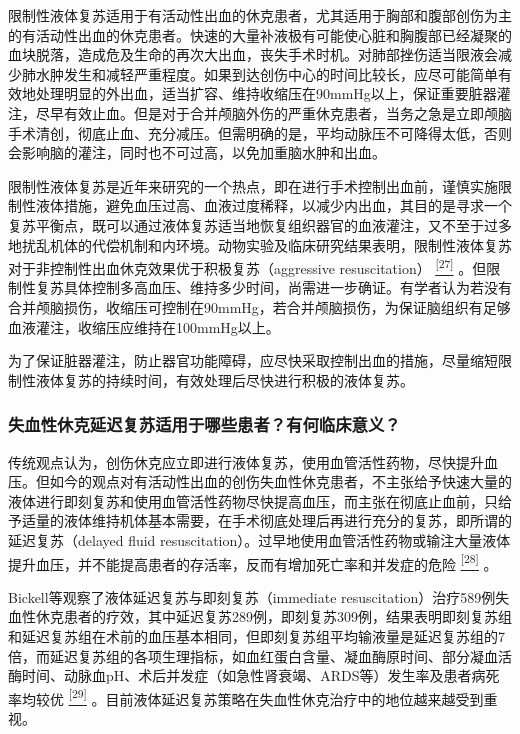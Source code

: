 限制性液体复苏适用于有活动性出血的休克患者，尤其适用于胸部和腹部创伤为主的有活动性出血的休克患者。快速的大量补液极有可能使心脏和胸腹部已经凝聚的血块脱落，造成危及生命的再次大出血，丧失手术时机。对肺部挫伤适当限液会减少肺水肿发生和减轻严重程度。如果到达创伤中心的时间比较长，应尽可能简单有效地处理明显的外出血，适当扩容、维持收缩压在90mmHg以上，保证重要脏器灌注，尽早有效止血。但是对于合并颅脑外伤的严重休克患者，当务之急是立即颅脑手术清创，彻底止血、充分减压。但需明确的是，平均动脉压不可降得太低，否则会影响脑的灌注，同时也不可过高，以免加重脑水肿和出血。

限制性液体复苏是近年来研究的一个热点，即在进行手术控制出血前，谨慎实施限制性液体措施，避免血压过高、血液过度稀释，以减少内出血，其目的是寻求一个复苏平衡点，既可以通过液体复苏适当地恢复组织器官的血液灌注，又不至于过多地扰乱机体的代偿机制和内环境。动物实验及临床研究结果表明，限制性液体复苏对于非控制性出血休克效果优于积极复苏（aggressive
resuscitation）
\protect\hyperlink{text00024.htmlux5cux23ch27-23}{\textsuperscript{{[}27{]}}}
。但限制性复苏具体控制多高血压、维持多少时间，尚需进一步确证。有学者认为若没有合并颅脑损伤，收缩压可控制在90mmHg，若合并颅脑损伤，为保证脑组织有足够血液灌注，收缩压应维持在100mmHg以上。

为了保证脏器灌注，防止器官功能障碍，应尽快采取控制出血的措施，尽量缩短限制性液体复苏的持续时间，有效处理后尽快进行积极的液体复苏。

\subsubsection{失血性休克延迟复苏适用于哪些患者？有何临床意义？}

传统观点认为，创伤休克应立即进行液体复苏，使用血管活性药物，尽快提升血压。但如今的观点对有活动性出血的创伤失血性休克患者，不主张给予快速大量的液体进行即刻复苏和使用血管活性药物尽快提高血压，而主张在彻底止血前，只给予适量的液体维持机体基本需要，在手术彻底处理后再进行充分的复苏，即所谓的延迟复苏（delayed
fluid
resuscitation）。过早地使用血管活性药物或输注大量液体提升血压，并不能提高患者的存活率，反而有增加死亡率和并发症的危险
\protect\hyperlink{text00024.htmlux5cux23ch28-23}{\textsuperscript{{[}28{]}}}
。

Bickell等观察了液体延迟复苏与即刻复苏（immediate
resuscitation）治疗589例失血性休克患者的疗效，其中延迟复苏289例，即刻复苏309例，结果表明即刻复苏组和延迟复苏组在术前的血压基本相同，但即刻复苏组平均输液量是延迟复苏组的7倍，而延迟复苏组的各项生理指标，如血红蛋白含量、凝血酶原时间、部分凝血活酶时间、动脉血pH、术后并发症（如急性肾衰竭、ARDS等）发生率及患者病死率均较优
\protect\hyperlink{text00024.htmlux5cux23ch29-23}{\textsuperscript{{[}29{]}}}
。目前液体延迟复苏策略在失血性休克治疗中的地位越来越受到重视。

